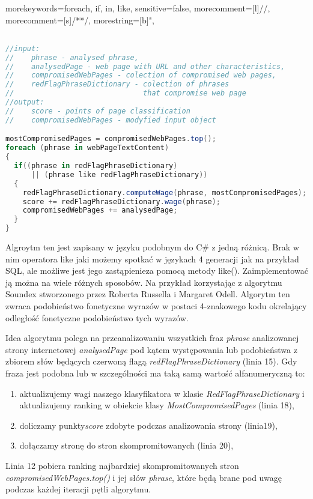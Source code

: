 \documentclass[10pt,twoside,a4paper]{article}
\begin{document}
%
 {morekeywords={foreach, if, in, like}, sensitive=false, morecomment=[l]{//}, morecomment=[s]{/*}{*/}, morestring=[b]", }
\lstset{
numbers=left, numberstyle=\tiny, stepnumber=1, numbersep=5pt
}
\begin{lstlisting}[title={Alg 1. Podstawowy algorytm klasyfikacji stron internetowych}, language=csharp, label=alg1] 

//input: 
//    phrase - analysed phrase, 
//    analysedPage - web page with URL and other characteristics, 
//    compromisedWebPages - colection of compromised web pages, 
//    redFlagPhraseDictionary - colection of phrases 
//                              that compromise web page
//output:
//    score - points of page classification
//    compromisedWebPages - modyfied input object

mostCompromisedPages = compromisedWebPages.top();
foreach (phrase in webPageTextContent)
{  
  if((phrase in redFlagPhraseDictionary) 
      || (phrase like redFlagPhraseDictionary))
  {
    redFlagPhraseDictionary.computeWage(phrase, mostCompromisedPages);
    score += redFlagPhraseDictionary.wage(phrase);
    compromisedWebPages += analysedPage;
  }
}
\end{lstlisting}


Algroytm ten jest zapisany w języku podobnym do C\# z jedną różnicą. Brak w nim operatora like jaki możemy spotkać w językach 4 generacji jak na przykład SQL, ale możliwe jest jego zastąpienieza pomocą metody like(). Zaimplementować ją można na wiele różnych sposobów. Na przykład korzystając z algorytmu Soundex stworzonego przez Roberta Russella i Margaret Odell\cite{donald_e._knuth_art_2002}. Algorytm ten zwraca podobieństwo fonetyczne wyrazów w postaci 4-znakowego kodu okrelający odległość fonetyczne podobieństwo tych wyrazów.

Idea algorytmu polega na przeanalizowaniu wszystkich fraz \textit{phrase} analizowanej strony internetowej \textit{analysedPage} pod kątem występowania lub podobieństwa z zbiorem słów będących czerwoną flagą \textit{redFlagPhraseDictionary} (linia 15). Gdy fraza jest podobna lub w szczególności ma taką samą wartość alfanumeryczną to:
\begin{enumerate}
\item aktualizujemy wagi naszego klasyfikatora w klasie \textit{RedFlagPhraseDictionary} i aktualizujemy ranking w obiekcie klasy \textit{MostCompromisedPages} (linia 18),
\item doliczamy punkty\textit{score} zdobyte podczas analizowania strony (linia19),
\item dołączamy stronę do stron skompromitowanych (linia 20),
\end{enumerate}
Linia 12 pobiera ranking najbardziej skompromitowanych stron \textit{compromisedWebPages.top()} i jej słów \textit{phrase}, które będą brane pod uwagę podczas każdej iteracji pętli algorytmu.
\end{document}
